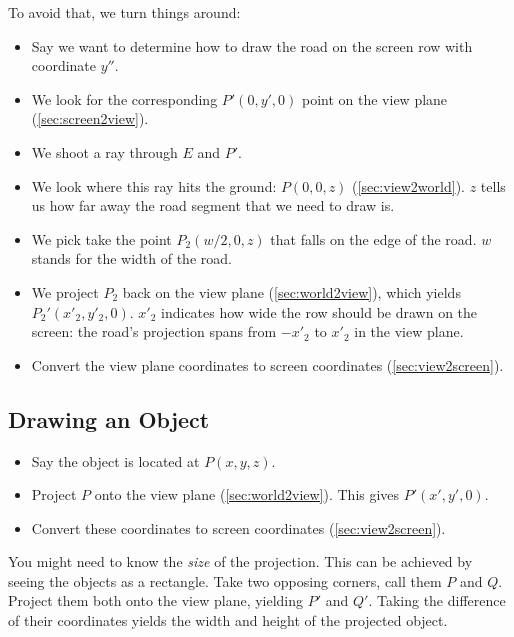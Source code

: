 \documentclass[a4paper]{article}
\newcommand{\coords}[3]{\ensuremath{(#1,#2,#3)}}
\begin{document}
To avoid that, we turn things around:
\begin{itemize}
    \item Say we want to determine how to draw the road on the screen row with coordinate $y''$.
    \item We look for the corresponding $P' \coords{0}{y'}{0}$ point on the view plane (\cref{sec:screen2view}).
    \item We shoot a ray through $E$ and $P'$.
    \item We look where this ray hits the ground: $P(0,0,z)$ (\cref{sec:view2world}). $z$ tells us how far away the road segment that we need to draw is.
    \item We pick take the point $P_2(w/2,0,z)$ that falls on the edge of the road. $w$ stands for the width of the road.
    \item We project $P_2$ back on the view plane (\cref{sec:world2view}), which yields $P_2'(x'_2, y'_2, 0)$. $x'_2$ indicates how wide the row should be drawn on the screen:
          the road's projection spans from $-x'_2$ to $x'_2$ in the view plane.
    \item Convert the view plane coordinates to screen coordinates (\cref{sec:view2screen}).
\end{itemize}

\subsection{Drawing an Object}

\begin{itemize}
    \item Say the object is located at $P(x, y, z)$.
    \item Project $P$ onto the view plane (\cref{sec:world2view}). This gives $P'(x', y', 0)$.
    \item Convert these coordinates to screen coordinates (\cref{sec:view2screen}).
\end{itemize}

You might need to know the \emph{size} of the projection. This can be achieved by seeing the objects as a rectangle.
Take two opposing corners, call them $P$ and $Q$. Project them both onto the view plane, yielding $P'$ and $Q'$.
Taking the difference of their coordinates yields the width and height of the projected object.
\end{document}
